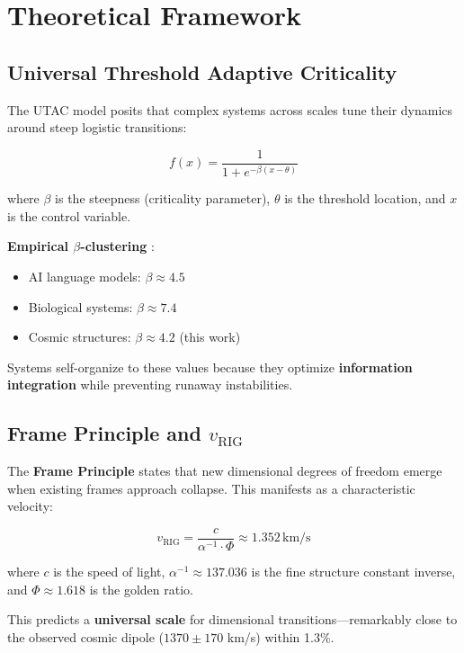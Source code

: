 \documentclass[11pt,a4paper,twocolumn]{article}
\begin{document}
\section{Theoretical Framework}

\subsection{Universal Threshold Adaptive Criticality}

The UTAC model \citep{romer2025utac} posits that complex systems across scales tune their dynamics around steep logistic transitions:

\begin{equation}
f(x) = \frac{1}{1 + e^{-\beta(x - \theta)}}
\end{equation}

where $\beta$ is the steepness (criticality parameter), $\theta$ is the threshold location, and $x$ is the control variable.

\textbf{Empirical $\beta$-clustering} \citep{romer2025beta}:
\begin{itemize}
    \item AI language models: $\beta \approx 4.5$
    \item Biological systems: $\beta \approx 7.4$
    \item Cosmic structures: $\beta \approx 4.2$ (this work)
\end{itemize}

Systems self-organize to these values because they optimize \textbf{information integration} while preventing runaway instabilities.

\subsection{Frame Principle and $v_{\text{RIG}}$}

The \textbf{Frame Principle} \citep{romer2025vrig} states that new dimensional degrees of freedom emerge when existing frames approach collapse. This manifests as a characteristic velocity:

\begin{equation}
v_{\text{RIG}} = \frac{c}{\alpha^{-1} \cdot \Phi} \approx 1.352 \, \text{km/s}
\end{equation}

where $c$ is the speed of light, $\alpha^{-1} \approx 137.036$ is the fine structure constant inverse, and $\Phi \approx 1.618$ is the golden ratio.

This predicts a \textbf{universal scale} for dimensional transitions---remarkably close to the observed cosmic dipole ($1370 \pm 170$ km/s) within 1.3\%.
\end{document}
